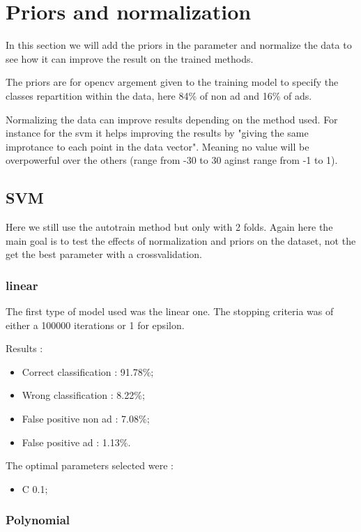 \section{Priors and normalization}

In this section we will add the priors in the parameter and normalize the data to see how it can improve the result on the trained methods.

The priors are for opencv argement given to the training model to specify the classes repartition within the data, here 84\% of non ad and 16\% of ads.

Normalizing the data can improve results depending on the method used. For instance for the svm it helps improving the results by "giving the same improtance to each point in the data vector". Meaning no value will be overpowerful over the others (range from -30 to 30 aginst range from -1 to 1).

\subsection{SVM}

Here we still use the autotrain method but only with 2 folds. Again here the main goal is to test the effects of normalization and priors on the dataset, not the get the best parameter with a crossvalidation.


\subsubsection{linear}

The first type of model used was the linear one. The stopping criteria was of either a 100000 iterations or 1 for epsilon.

Results :
\begin{itemize}
  \item Correct classification : 91.78\%;
  \item Wrong classification : 8.22\%;
  \item False positive non ad : 7.08\%;
  \item False positive ad : 1.13\%.
\end{itemize}

The optimal parameters selected were :
\begin{itemize}
  \item C 0.1;
\end{itemize}

\subsubsection{Polynomial}

